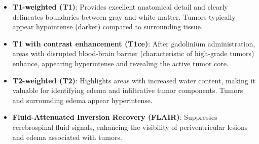 \begin{itemize}
      \item \textbf{T1-weighted (T1)}: Provides excellent anatomical detail and clearly delineates boundaries between gray and white matter. Tumors typically appear hypointense (darker) compared to surrounding tissue.


      \item \textbf{T1 with contrast enhancement (T1ce)}: After gadolinium administration, areas with disrupted blood-brain barrier (characteristic of high-grade tumors) enhance, appearing hyperintense and revealing the active tumor core.


      \item \textbf{T2-weighted (T2)}: Highlights areas with increased water content, making it valuable for identifying edema and infiltrative tumor components. Tumors and surrounding edema appear hyperintense.


      \item \textbf{Fluid-Attenuated Inversion Recovery (FLAIR)}: Suppresses cerebrospinal fluid signals, enhancing the visibility of periventricular lesions and edema associated with tumors.

\end{itemize}


